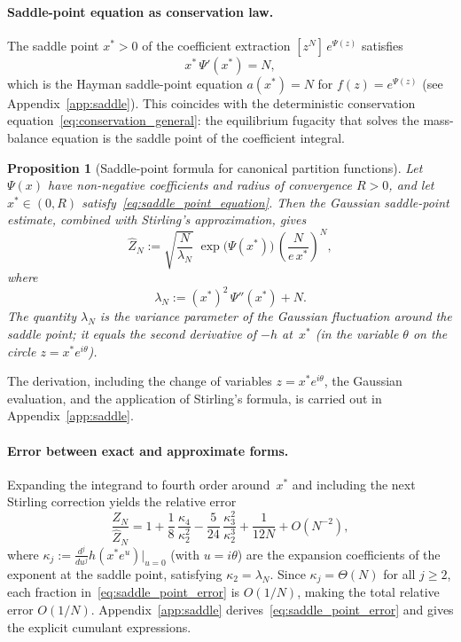 \documentclass[11pt]{amsart}
\newcommand{\GFensemble}{Z}
\newcommand{\GFcomb}{\Psi}
\theoremstyle{definition}
\theoremstyle{plain}
\newtheorem{proposition}{Proposition}
\theoremstyle{remark}
\begin{document}
\paragraph{Saddle-point equation as conservation law.}
The saddle point $x^*>0$ of the coefficient extraction $[z^N]\,e^{\GFcomb(z)}$ satisfies
\begin{equation}\label{eq:saddle_point_equation}
x^*\,\GFcomb'(x^*) = N,
\end{equation}
which is the Hayman saddle-point equation $a(x^*)=N$ for $f(z)=e^{\GFcomb(z)}$ (see Appendix~\ref{app:saddle}).
This coincides with the deterministic conservation equation~\eqref{eq:conservation_general}: the equilibrium fugacity that solves the mass-balance equation is the saddle point of the coefficient integral.

\begin{proposition}[Saddle-point formula for canonical partition functions]
\label{prop:saddle_point_general}
Let $\GFcomb(x)$ have non-negative coefficients and radius of convergence $R>0$, and let $x^*\in(0,R)$ satisfy~\eqref{eq:saddle_point_equation}.
Then the Gaussian saddle-point estimate, combined with Stirling's approximation, gives
\begin{equation}\label{eq:saddle_point_general}
\widehat{\GFensemble}_N
:=
\sqrt{\frac{N}{\lambda_N}}\;
\exp\!\bigl(\GFcomb(x^*)\bigr)\,
\left(\frac{N}{e\,x^*}\right)^{\!N},
\end{equation}
where
\begin{equation}\label{eq:lambda_def}
\lambda_N := (x^*)^2\,\GFcomb''(x^*) + N.
\end{equation}
The quantity $\lambda_N$ is the variance parameter of the Gaussian fluctuation around the saddle point; it equals the second derivative of $-h$ at~$x^*$ (in the variable $\theta$ on the circle $z=x^*e^{i\theta}$).
\end{proposition}

The derivation, including the change of variables $z=x^*e^{i\theta}$, the Gaussian evaluation, and the application of Stirling's formula, is carried out in Appendix~\ref{app:saddle}.

\paragraph{Error between exact and approximate forms.}
Expanding the integrand to fourth order around~$x^*$ and including the next Stirling correction yields the relative error
\begin{equation}\label{eq:saddle_point_error}
\frac{\GFensemble_N}{\widehat{\GFensemble}_N}
= 1
+ \frac{1}{8}\,\frac{\kappa_4}{\kappa_2^2}
- \frac{5}{24}\,\frac{\kappa_3^2}{\kappa_2^3}
+ \frac{1}{12N}
+ O\!\left(N^{-2}\right),
\end{equation}
where $\kappa_j := \frac{d^j}{du^j}h(x^*e^{u})\big|_{u=0}$ (with $u=i\theta$) are the expansion coefficients of the exponent at the saddle point, satisfying $\kappa_2 = \lambda_N$.
Since $\kappa_j = \Theta(N)$ for all $j\ge 2$, each fraction in~\eqref{eq:saddle_point_error} is $O(1/N)$, making the total relative error $O(1/N)$.
Appendix~\ref{app:saddle} derives~\eqref{eq:saddle_point_error} and gives the explicit cumulant expressions.
\end{document}
